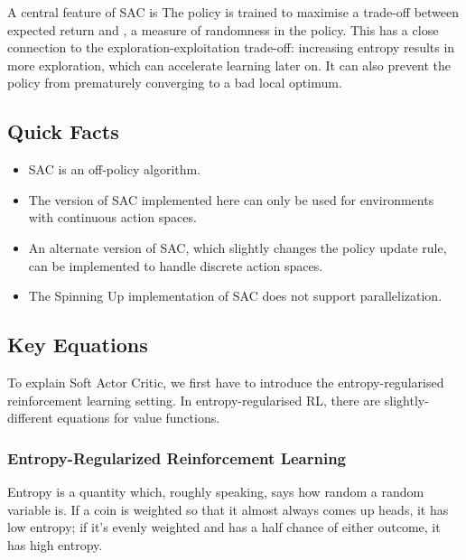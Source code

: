 \documentclass[letterpaper,10pt,english]{sphinxmanual}
\begin{document}
A central feature of SAC is  The policy is trained to maximise a trade-off between expected return and , a measure of randomness in the policy. This has a close connection to the exploration-exploitation trade-off: increasing entropy results in more exploration, which can accelerate learning later on. It can also prevent the policy from prematurely converging to a bad local optimum.


\subsection{Quick Facts}
\label{\detokenize{algorithms/sac:quick-facts}}\begin{itemize}
\item {} 
SAC is an off-policy algorithm.

\item {} 
The version of SAC implemented here can only be used for environments with continuous action spaces.

\item {} 
An alternate version of SAC, which slightly changes the policy update rule, can be implemented to handle discrete action spaces.

\item {} 
The Spinning Up implementation of SAC does not support parallelization.

\end{itemize}


\subsection{Key Equations}
\label{\detokenize{algorithms/sac:key-equations}}
To explain Soft Actor Critic, we first have to introduce the entropy-regularised reinforcement learning setting. In entropy-regularised RL, there are slightly-different equations for value functions.


\subsubsection{Entropy-Regularized Reinforcement Learning}
\label{\detokenize{algorithms/sac:entropy-regularized-reinforcement-learning}}
Entropy is a quantity which, roughly speaking, says how random a random variable is. If a coin is weighted so that it almost always comes up heads, it has low entropy; if it’s evenly weighted and has a half chance of either outcome, it has high entropy.
\end{document}
